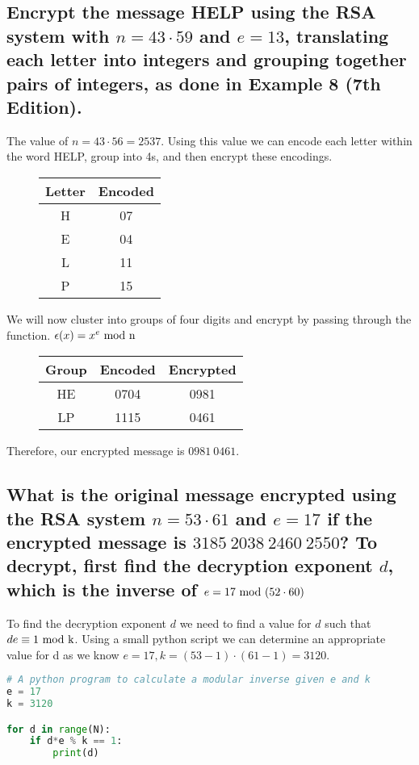 \subsection{Encrypt the message HELP using the RSA system with $n=43\cdot 59$ and $e=13$, translating each letter into integers and grouping together pairs of integers, as done in Example 8 (7th Edition).}
The value of $n=43\cdot 56 = 2537$. Using this value we can encode each letter within the word HELP, group into 4s, and then encrypt these encodings.

\begin{figure}[ht]
\centering
\begin{tabular}{|c|c|}
\hline
Letter & Encoded \\
\hline
H & 07 \\
E & 04 \\
L & 11 \\
P & 15 \\
\hline
\end{tabular}
\end{figure}

We will now cluster into groups of four digits and encrypt by passing through the function. $\epsilon(x) = x^e \rm{~mod~} n$

\begin{figure}[ht]
\centering
\begin{tabular}{|c|c|c|}
\hline
Group & Encoded & Encrypted \\
\hline
HE & 0704 & 0981 \\
LP & 1115 & 0461 \\
\hline
\end{tabular}
\end{figure}

Therefore, our encrypted message is $0981~0461$.

\subsection{What is the original message encrypted using the RSA system $n = 53\cdot 61$ and $e=17$ if the encrypted message is $3185~2038~2460~2550$? To decrypt, first find the decryption exponent $d$, which is the inverse of $e=17 \rm{~mod~} (52\cdot 60)$}

To find the decryption exponent $d$ we need to find a value for $d$ such that $de \equiv 1 \rm{~mod~} k$. Using a small python script we can determine an appropriate value for d as we know $e=17, k=(53-1)\cdot (61-1)=3120$.

\begin{lstlisting}[language=Python]
# A python program to calculate a modular inverse given e and k
e = 17
k = 3120

for d in range(N):
    if d*e % k == 1:
        print(d)
\end{lstlisting}


